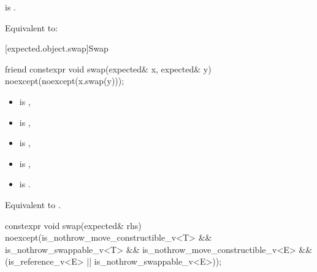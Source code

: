 \begin{itemdescr}
\pnum
\constraints
{} is .

\pnum
\effects
Equivalent to: 
\end{itemdescr}

[expected.object.swap]{Swap}

%
\begin{itemdecl}
friend constexpr void swap(expected& x, expected& y) noexcept(noexcept(x.swap(y)));
\end{itemdecl}

\begin{itemdescr}
\pnum
\constraints
\begin{itemize}
\item {} is ,
\item {} is ,
\item {} is ,
\item {} is ,
\item {} is .
\end{itemize}

\pnum
\effects
Equivalent to .
\end{itemdescr}

%
\begin{itemdecl}
constexpr void swap(expected& rhs) noexcept(is_nothrow_move_constructible_v<T> &&
                                            is_nothrow_swappable_v<T> &&
                                            is_nothrow_move_constructible_v<E> &&
                                            (is_reference_v<E> ||
                                             is_nothrow_swappable_v<E>));
\end{itemdecl}


